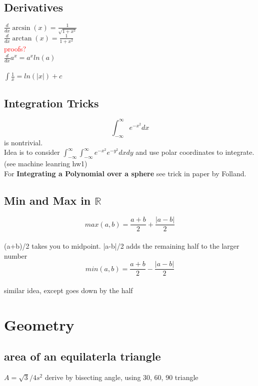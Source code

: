 \documentclass[a4paper, 12pt]{article}
\def\R{\ensuremath{\mathbb{R}}} %
\newcommand{\gray}[1]{\textcolor[gray]{0.5}{#1}} %
\begin{document}
\subsection*{Derivatives}
$\displaystyle \frac{d}{dx} \arcsin(x) = \frac{1}{\sqrt{1+x^2}}$\\
$\displaystyle \frac{d}{dx} \arctan(x) = \frac{1}{1+x^2}$\\
\textcolor{red}{proofs?}\\

\noindent $\displaystyle \frac{d}{dx} a^x = a^x ln(a)$\\
\ \\
$\displaystyle \int \frac{1}{x} = ln(|x|) + c$ \\

\subsection*{Integration Tricks}

$$\int_{- \infty}^\infty e^{-x^2} dx$$
is nontrivial.\\
Idea is to consider $\int_{- \infty}^\infty\int_{- \infty}^\infty e^{-x^2}e^{-y^2} dx dy$ and use polar coordinates to integrate.\\
(see machine leanring hw1)\\

For \textbf{Integrating a Polynomial over a sphere} see trick in paper by Folland.

\subsection*{Min and Max in $\R$}

$$max(a, b) = \frac{a+b}{2} + \frac{|a-b|}{2}$$\\
\gray{(a+b)/2 takes you to midpoint. |a-b|/2 adds the remaining half to the larger number}\\

$$min(a, b) = \frac{a+b}{2} - \frac{|a-b|}{2}$$ \\
\gray{similar idea, except goes down by the half}

\section*{Geometry}
\subsection*{area of an equilaterla triangle}
$A = \sqrt{3}/4 s^2$
\gray{derive by bisecting angle, using 30, 60, 90 triangle}
\end{document}
